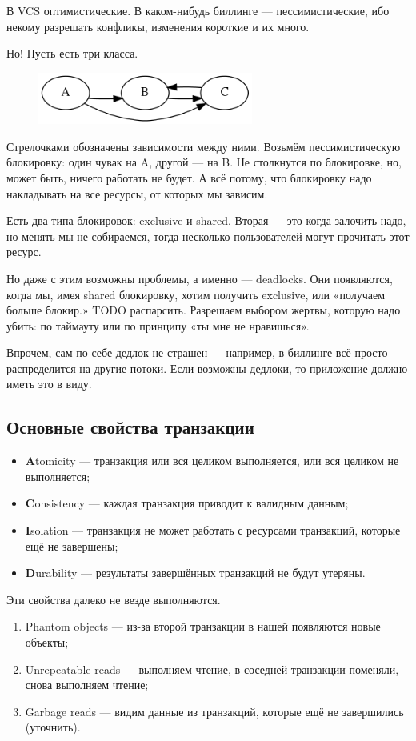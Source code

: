 \documentclass[11pt,a4paper]{article}
\begin{document}
В VCS оптимистические. В каком-нибудь биллинге — пессимистические, ибо некому разрешать конфликы, изменения короткие и их много.

Но! Пусть есть три класса.

\begin{figure}[H]
	\centering
	\includegraphics[width=200pt]{pics/locks.png}
\end{figure}

Стрелочками обозначены зависимости между ними. Возьмём пессимистическую блокировку: один чувак на A, другой — на B. Не столкнутся по блокировке, но, может быть, ничего работать не будет. А всё потому, что блокировку надо накладывать на все ресурсы, от которых мы зависим.

Есть два типа блокировок: exclusive и shared. Вторая — это когда залочить надо, но менять мы не собираемся, тогда несколько пользователей могут прочитать этот ресурс.

Но даже с этим возможны проблемы, а именно — deadlocks. Они появляются, когда мы, имея shared блокировку, хотим получить exclusive, или «получаем больше блокир.» TODO распарсить. Разрешаем выбором жертвы, которую надо убить: по таймауту или по принципу «ты мне не нравишься».

Впрочем, сам по себе дедлок не страшен — например, в биллинге всё просто распределится на другие потоки. Если возможны дедлоки, то приложение должно иметь это в виду.

\subsection{Основные свойства транзакции}
\begin{itemize}
\item \textbf{A}tomicity — транзакция или вся целиком выполняется, или вся целиком не выполняется;
\item \textbf{C}onsistency — каждая транзакция приводит к валидным данным;
\item \textbf{I}solation — транзакция не может работать с ресурсами транзакций, которые ещё не завершены;
\item \textbf{D}urability — результаты завершённых транзакций не будут утеряны.
\end{itemize}

Эти свойства далеко не везде выполняются.
\begin{enumerate}
\item Phantom objects — из-за второй транзакции в нашей появляются новые объекты;
\item Unrepeatable reads — выполняем чтение, в соседней транзакции поменяли, снова выполняем чтение;
\item Garbage reads — видим данные из транзакций, которые ещё не завершились (уточнить).
\end{enumerate}
\end{document}
